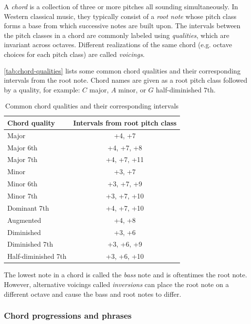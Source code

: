 \documentclass[dissertation.tex]{subfiles}
\begin{document}
A \emph{chord} is a collection of three or more pitches all sounding
simultaneously\cite{randel1999harvard}. In Western classical music, they
typically consist of a \emph{root note} whose pitch class forms a base from
which successive notes are built upon. The intervals between the pitch classes
in a chord are commonly labeled using \emph{qualities}, which are invariant
across octaves. Different realizations of the same chord (e.g. octave choices
for each pitch class) are called \emph{voicings}.

\autoref{tab:chord-qualities} lists some common chord qualities and their
corresponding intervals from the root note. Chord names are given as a root
pitch class followed by a quality, for example: $C$ major, $A$ minor, or $G$
half-diminished $7$th.

\begin{table}[htpb]
    \centering
    \begin{tabular}{lc}
        \toprule
        Chord quality & Intervals from root pitch class \\
        \midrule
        Major & +4, +7 \\
        Major 6th & +4, +7, +8 \\
        Major 7th & +4, +7, +11 \\
        Minor & +3, +7 \\
        Minor 6th & +3, +7, +9 \\
        Minor 7th & +3, +7, +10 \\
        Dominant 7th & +4, +7, +10 \\
        Augmented & +4, +8 \\
        Diminished & +3, +6 \\
        Diminished 7th & +3, +6, +9 \\
        Half-diminished 7th & +3, +6, +10 \\
        \bottomrule
    \end{tabular}
    \caption{Common chord qualities and their corresponding intervals\cite{freedman2015correlational}}
    \label{tab:chord-qualities}
\end{table}

The lowest note in a chord is called the \emph{bass} note and is oftentimes the
root note. However, alternative voicings called \emph{inversions} can place the
root note on a different octave and cause the bass and root notes to
differ.

\subsubsection{Chord progressions and phrases}
\end{document}
